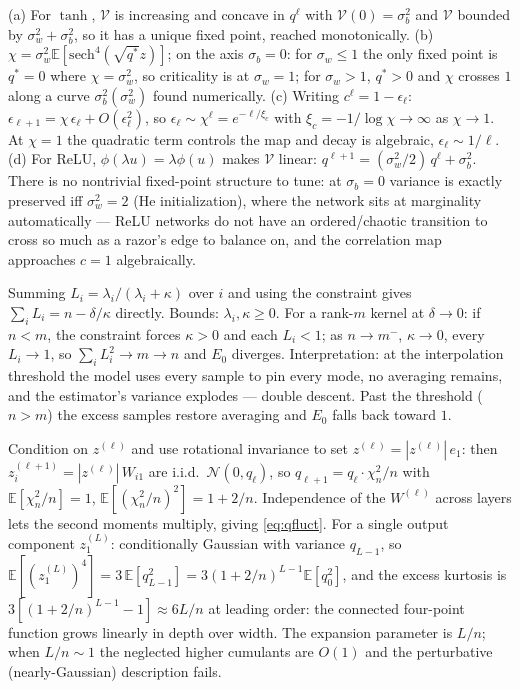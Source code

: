 \documentclass[11pt]{article}
\newcommand{\E}{\mathbb{E}}
\begin{document}
\begin{solution}
(a) For $\tanh$, $\mathcal{V}$ is increasing and concave in $q^\ell$ with
$\mathcal{V}(0) = \sigma_b^2$ and $\mathcal{V}$ bounded by $\sigma_w^2 +
\sigma_b^2$, so it has a unique fixed point, reached monotonically.
(b) $\chi = \sigma_w^2 \E[\mathrm{sech}^4(\sqrt{q^*} z)]$; on the axis
$\sigma_b = 0$: for $\sigma_w \le 1$ the only fixed point is $q^* = 0$
where $\chi = \sigma_w^2$, so criticality is at $\sigma_w = 1$; for
$\sigma_w > 1$, $q^* > 0$ and $\chi$ crosses $1$ along a curve
$\sigma_b^2(\sigma_w^2)$ found numerically.
(c) Writing $c^\ell = 1 - \epsilon_\ell$: $\epsilon_{\ell+1} =
\chi\,\epsilon_\ell + O(\epsilon_\ell^2)$, so $\epsilon_\ell \sim
\chi^\ell = e^{-\ell/\xi_c}$ with $\xi_c = -1/\log\chi \to \infty$ as
$\chi \to 1$. At $\chi = 1$ the quadratic term controls the map and decay
is algebraic, $\epsilon_\ell \sim 1/\ell$.
(d) For ReLU, $\phi(\lambda u) = \lambda\phi(u)$ makes $\mathcal{V}$
linear: $q^{\ell+1} = (\sigma_w^2/2)\, q^\ell + \sigma_b^2$. There is no
nontrivial fixed-point structure to tune: at $\sigma_b = 0$ variance is
exactly preserved iff $\sigma_w^2 = 2$ (He initialization), where the
network sits at marginality automatically --- ReLU networks do not have an
ordered/chaotic transition to cross so much as a razor's edge to balance
on, and the correlation map approaches $c = 1$ algebraically.
\end{solution}

\begin{solution}[ex:conservation]
Summing $L_i = \lambda_i/(\lambda_i+\kappa)$ over $i$ and using the
constraint gives $\sum_i L_i = n - \delta/\kappa$ directly. Bounds:
$\lambda_i, \kappa \ge 0$. For a rank-$m$ kernel at $\delta \to 0$: if
$n < m$, the constraint forces $\kappa > 0$ and each $L_i < 1$; as
$n \to m^{-}$, $\kappa \to 0$, every $L_i \to 1$, so
$\sum_i L_i^2 \to m \to n$ and $E_0$ diverges. Interpretation: at the
interpolation threshold the model uses every sample to pin every mode, no
averaging remains, and the estimator's variance explodes --- double descent.
Past the threshold ($n > m$) the excess samples restore averaging and
$E_0$ falls back toward $1$.
\end{solution}

\begin{solution}
Condition on $z^{(\ell)}$ and use rotational invariance to set
$z^{(\ell)} = |z^{(\ell)}|\,e_1$: then $z^{(\ell+1)}_i = |z^{(\ell)}|\,
W_{i1}$ are i.i.d.\ $\mathcal{N}(0, q_\ell)$, so $q_{\ell+1} =
q_\ell\cdot\chi^2_n/n$ with $\E[\chi^2_n/n] = 1$,
$\E[(\chi^2_n/n)^2] = 1 + 2/n$. Independence of the $W^{(\ell)}$ across
layers lets the second moments multiply, giving \cref{eq:qfluct}. For a
single output component $z^{(L)}_1$: conditionally Gaussian with variance
$q_{L-1}$, so $\E[(z_1^{(L)})^4] = 3\,\E[q_{L-1}^2] =
3(1+2/n)^{L-1}\E[q_0^2]$, and the excess kurtosis is
$3[(1+2/n)^{L-1} - 1] \approx 6L/n$ at leading order: the connected
four-point function grows linearly in depth over width. The expansion
parameter is $L/n$; when $L/n \sim 1$ the neglected higher cumulants are
$O(1)$ and the perturbative (nearly-Gaussian) description fails.
\end{solution}
\end{document}
